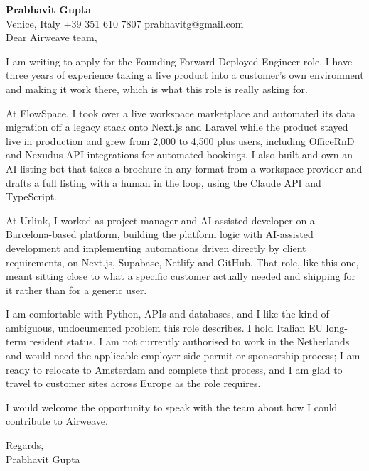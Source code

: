 \documentclass[a4paper,10.5pt]{article}
\begin{document}
\textbf{Prabhavit Gupta}\\
Venice, Italy \textbar{} +39 351 610 7807 \textbar{} prabhavitg@gmail.com\\[10pt]
Dear Airweave team,

I am writing to apply for the Founding Forward Deployed Engineer role. I have three years of experience taking a live product into a customer's own environment and making it work there, which is what this role is really asking for.

At FlowSpace, I took over a live workspace marketplace and automated its data migration off a legacy stack onto Next.js and Laravel while the product stayed live in production and grew from 2,000 to 4,500 plus users, including OfficeRnD and Nexudus API integrations for automated bookings. I also built and own an AI listing bot that takes a brochure in any format from a workspace provider and drafts a full listing with a human in the loop, using the Claude API and TypeScript.

At Urlink, I worked as project manager and AI-assisted developer on a Barcelona-based platform, building the platform logic with AI-assisted development and implementing automations driven directly by client requirements, on Next.js, Supabase, Netlify and GitHub. That role, like this one, meant sitting close to what a specific customer actually needed and shipping for it rather than for a generic user.

I am comfortable with Python, APIs and databases, and I like the kind of ambiguous, undocumented problem this role describes. I hold Italian EU long-term resident status. I am not currently authorised to work in the Netherlands and would need the applicable employer-side permit or sponsorship process; I am ready to relocate to Amsterdam and complete that process, and I am glad to travel to customer sites across Europe as the role requires.

I would welcome the opportunity to speak with the team about how I could contribute to Airweave.

Regards,\\
Prabhavit Gupta
\end{document}
